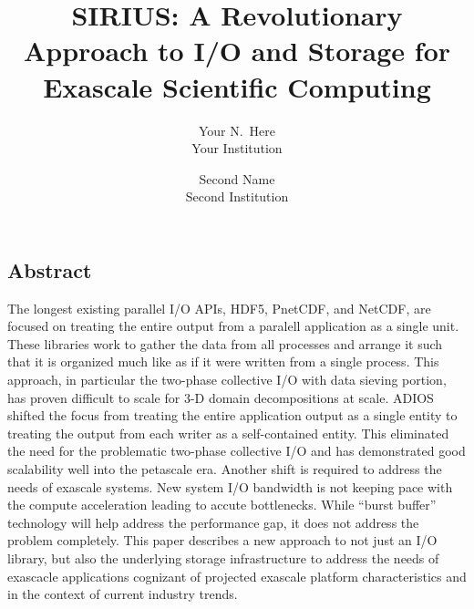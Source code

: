 \documentclass[letterpaper,twocolumn,10pt]{article}
\begin{document}
\date{}

\title{\Large \bf SIRIUS: A Revolutionary Approach to I/O and Storage for Exascale Scientific Computing}

\author{
{\rm Your N.\ Here}\\
Your Institution
\and
{\rm Second Name}\\
Second Institution
} %


\maketitle

\thispagestyle{empty}


\subsection*{Abstract}
The longest existing parallel I/O APIs, HDF5, PnetCDF, and NetCDF, are focused
on treating the entire output from a paralell application as a single unit.
These libraries work to gather the data from all processes and arrange it such
that it is organized much like as if it were written from a single process.
This approach, in particular the two-phase collective I/O with data sieving
portion, has proven difficult to scale for 3-D domain decompositions at scale.
ADIOS shifted the focus from treating the entire application output as a single
entity to treating the output from each writer as a self-contained entity. This
eliminated the need for the problematic two-phase collective I/O and has
demonstrated good scalability well into the petascale era. Another shift is
required to address the needs of exascale systems. New system I/O bandwidth is
not keeping pace with the compute acceleration leading to accute bottlenecks.
While ``burst buffer'' technology will help address the performance gap, it
does not address the problem completely. This paper describes a new approach
to not just an I/O library, but also the underlying storage infrastructure to
address the needs of exascacle applications cognizant of projected exascale
platform characteristics and in the context of current industry trends.
\end{document}
